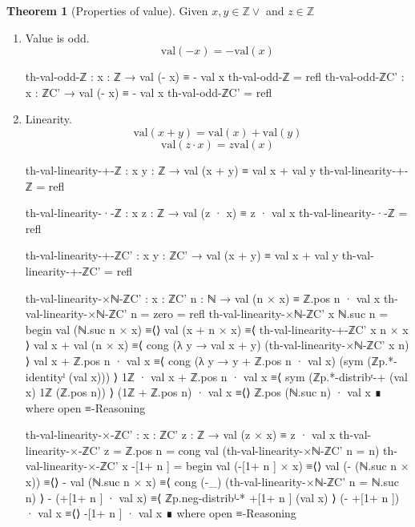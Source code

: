 \documentclass[a4paper]{report}
\theoremstyle{definition}
\theoremstyle{lemma}
\theoremstyle{theorem}
\newtheorem{theorem}{Theorem}
\newcommand\bZ{\mathbb{Z}}
\begin{document}
\begin{theorem}[Properties of value]
Given $x,y\in\bZ \lor $ and $z\in\bZ$
\begin{enumerate}
  \item Value is odd.
    \[\mathrm{val}(-x) = -\mathrm{val}(x)\]
    \begin{code}
th-val-odd-ℤ : {x : ℤ} → val (- x) ≡ - val x
th-val-odd-ℤ = refl
th-val-odd-ℤC' : {x : ℤC'} → val (- x) ≡ - val x
th-val-odd-ℤC' = refl
\end{code}
  \item Linearity.
    \[\mathrm{val}(x+y) = \mathrm{val}(x)+\mathrm{val}(y)\]
    \[\mathrm{val}(z\cdot x) = z\mathrm{val}(x)\]
    \begin{code}
th-val-linearity-+-ℤ : {x y : ℤ} → val (x + y) ≡ val x + val y
th-val-linearity-+-ℤ = refl

th-val-linearity-·-ℤ : {x z : ℤ} → val (z · x) ≡ z · val x
th-val-linearity-·-ℤ = refl


th-val-linearity-+-ℤC' : {x y : ℤC'} → val (x + y) ≡ val x + val y
th-val-linearity-+-ℤC' = refl

th-val-linearity-×ℕ-ℤC' : {x : ℤC'} {n : ℕ} → val (n × x) ≡ ℤ.pos n · val x
th-val-linearity-×ℕ-ℤC' {n = zero}    = refl
th-val-linearity-×ℕ-ℤC' {x} {ℕ.suc n} = begin
  val (ℕ.suc n × x)            ≡⟨⟩
  val (x + n × x)              ≡⟨ th-val-linearity-+-ℤC' {x} {n × x} ⟩
  val x + val (n × x)          ≡⟨ cong (λ y → val x + y)
                                  (th-val-linearity-×ℕ-ℤC' {x} {n}) ⟩
  val x + ℤ.pos n · val x      ≡⟨ cong (λ y → y + ℤ.pos n · val x)
                                       (sym (ℤp.*-identityˡ (val  x))) ⟩
  1ℤ · val x + ℤ.pos n · val x ≡⟨ sym (ℤp.*-distribʳ-+ (val x) 1ℤ (ℤ.pos n)) ⟩
  (1ℤ + ℤ.pos n) · val x       ≡⟨⟩
  ℤ.pos (ℕ.suc n) · val x      ∎
  where open ≡-Reasoning

th-val-linearity-×-ℤC' : {x : ℤC'} {z : ℤ} → val (z × x) ≡ z · val x
th-val-linearity-×-ℤC' {z = ℤ.pos n}  = cong val (th-val-linearity-×ℕ-ℤC' {n = n})
th-val-linearity-×-ℤC' {x} { -[1+ n ]} = begin
  val (-[1+ n ] × x)        ≡⟨⟩
  val (- (ℕ.suc n × x))     ≡⟨⟩
  - val (ℕ.suc n × x)       ≡⟨ cong (-_) (th-val-linearity-×ℕ-ℤC' {n = ℕ.suc n}) ⟩
  - (+[1+ n ] · val x)      ≡⟨ ℤp.neg-distribˡ-* +[1+ n ] (val x) ⟩
  (- +[1+ n ]) · val x      ≡⟨⟩
  -[1+ n ] · val x          ∎
  where open ≡-Reasoning
  \end{code}
\end{enumerate}
\end{theorem}
\end{document}
